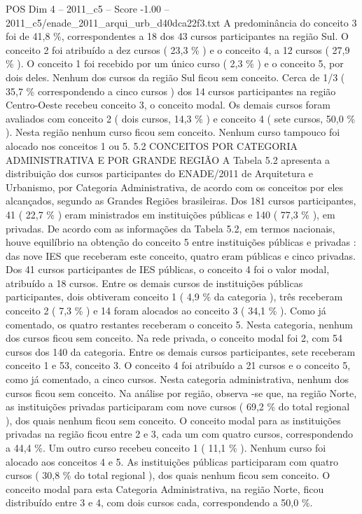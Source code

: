 \begin{textsample}{POS Dim 4 – 2011\_c5 – Score -1.00 – 2011\_c5/enade\_2011\_arqui\_urb\_d40dca22f3.txt}
A predominância do conceito 3 foi de 41,8 \%, correspondentes a 18 dos 43 cursos participantes na região Sul.
O conceito 2 foi atribuído a dez cursos ( 23,3 \% ) e o conceito 4, a 12 cursos ( 27,9 \% ).
O conceito 1 foi recebido por um único curso ( 2,3 \% ) e o conceito 5, por dois deles.
Nenhum dos cursos da região Sul ficou sem conceito.
Cerca de 1/3 ( 35,7 \% correspondendo a cinco cursos ) dos 14 cursos participantes na região Centro-Oeste recebeu conceito 3, o conceito modal.
Os demais cursos foram avaliados com conceito 2 ( dois cursos, 14,3 \% ) e conceito 4 ( sete cursos, 50,0 \% ).
Nesta região nenhum curso ficou sem conceito.
Nenhum curso tampouco foi alocado nos conceitos 1 ou 5. 5.2 CONCEITOS POR CATEGORIA ADMINISTRATIVA E POR GRANDE REGIÃO A Tabela 5.2 apresenta a distribuição dos cursos participantes do ENADE/2011 de Arquitetura e Urbanismo, por Categoria Administrativa, de acordo com os conceitos por eles alcançados, segundo as Grandes Regiões brasileiras.
Dos 181 cursos participantes, 41 ( 22,7 \% ) eram ministrados em instituições públicas e 140 ( 77,3 \% ), em privadas.
De acordo com as informações da Tabela 5.2, em termos nacionais, houve equilíbrio na obtenção do conceito 5 entre instituições públicas e privadas : das nove IES que receberam este conceito, quatro eram públicas e cinco privadas.
Dos 41 cursos participantes de IES públicas, o conceito 4 foi o valor modal, atribuído a 18 cursos.
Entre os demais cursos de instituições públicas participantes, dois obtiveram conceito 1 ( 4,9 \% da categoria ), três receberam conceito 2 ( 7,3 \% ) e 14 foram alocados ao conceito 3 ( 34,1 \% ).
Como já comentado, os quatro restantes receberam o conceito 5.
Nesta categoria, nenhum dos cursos ficou sem conceito.
Na rede privada, o conceito modal foi 2, com 54 cursos dos 140 da categoria.
Entre os demais cursos participantes, sete receberam conceito 1 e 53, conceito 3.
O conceito 4 foi atribuído a 21 cursos e o conceito 5, como já comentado, a cinco cursos.
Nesta categoria administrativa, nenhum dos cursos ficou sem conceito.
Na análise por região, observa -se que, na região Norte, as instituições privadas participaram com nove cursos ( 69,2 \% do total regional ), dos quais nenhum ficou sem conceito.
O conceito modal para as instituições privadas na região ficou entre 2 e 3, cada um com quatro cursos, correspondendo a 44,4 \%.
Um outro curso recebeu conceito 1 ( 11,1 \% ).
Nenhum curso foi alocado aos conceitos 4 e 5.
As instituições públicas participaram com quatro cursos ( 30,8 \% do total regional ), dos quais nenhum ficou sem conceito.
O conceito modal para esta Categoria Administrativa, na região Norte, ficou distribuído entre 3 e 4, com dois cursos cada, correspondendo a 50,0 \%.

\end{textsample}
